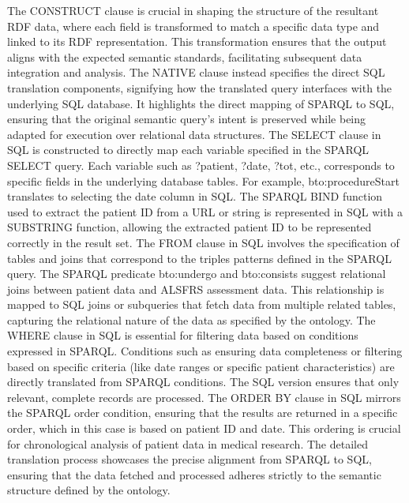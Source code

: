 The CONSTRUCT clause is crucial in shaping the structure of the resultant \ac{RDF} data, where each field is transformed to match a specific data type and linked to its \ac{RDF} representation. This transformation ensures that the output aligns with the expected semantic standards, facilitating subsequent data integration and analysis.
The NATIVE clause instead specifies the direct \ac{SQL} translation components, signifying how the translated query interfaces with the underlying \ac{SQL} database. It highlights the direct mapping of \ac{SPARQL} to \ac{SQL}, ensuring that the original semantic query's intent is preserved while being adapted for execution over relational data structures.
The SELECT clause in \ac{SQL} is constructed to directly map each variable specified in the \ac{SPARQL} SELECT query. Each variable such as ?patient, ?date, ?tot, etc., corresponds to specific fields in the underlying database tables. For example, bto:procedureStart translates to selecting the date column in \ac{SQL}. The \ac{SPARQL} BIND function used to extract the patient ID from a URL or string is represented in \ac{SQL} with a SUBSTRING function, allowing the extracted patient ID to be represented correctly in the result set.
The FROM clause in \ac{SQL} involves the specification of tables and joins that correspond to the triples patterns defined in the \ac{SPARQL} query. The \ac{SPARQL} predicate bto:undergo and bto:consists suggest relational joins between patient data and \ac{ALSFRS} assessment data. This relationship is mapped to \ac{SQL} joins or subqueries that fetch data from multiple related tables, capturing the relational nature of the data as specified by the ontology.
The WHERE clause in \ac{SQL} is essential for filtering data based on conditions expressed in \ac{SPARQL}. Conditions such as ensuring data completeness or filtering based on specific criteria (like date ranges or specific patient characteristics) are directly translated from \ac{SPARQL} conditions. The \ac{SQL} version ensures that only relevant, complete records are processed.
The ORDER BY clause in \ac{SQL} mirrors the \ac{SPARQL} order condition, ensuring that the results are returned in a specific order, which in this case is based on patient ID and date. This ordering is crucial for chronological analysis of patient data in medical research.
The detailed translation process showcases the precise alignment from \ac{SPARQL} to \ac{SQL}, ensuring that the data fetched and processed adheres strictly to the semantic structure defined by the ontology.

